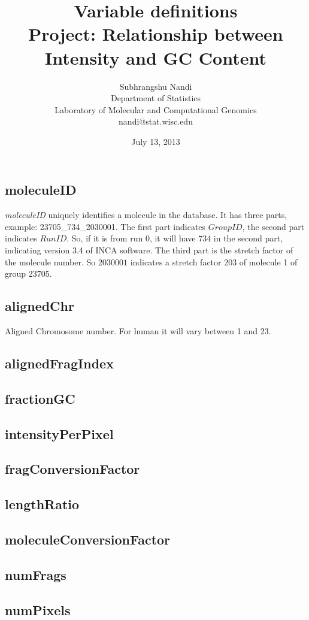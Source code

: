 \documentclass[11pt]{article}
\begin{document}


\title{Variable definitions\\ Project: Relationship between Intensity and GC Content}
\author{Subhrangshu Nandi\\
  Department of Statistics\\
  Laboratory of Molecular and Computational Genomics\\
  nandi@stat.wisc.edu}
\date{July 13, 2013}
\maketitle

\subsection*{moleculeID}
{\emph{moleculeID}} uniquely identifies a molecule in the database. It has three parts, example: 23705\_734\_2030001. The first part indicates $GroupID$, the second part indicates $RunID$. So, if it is from run $0$, it will have $734$ in the second part, indicating version 3.4 of INCA software. The third part is the stretch factor of the molecule number. So $2030001$ indicates a stretch factor 203 of molecule 1 of group 23705.

\subsection*{alignedChr}
Aligned Chromosome number. For human it will vary between 1 and 23.

\subsection*{alignedFragIndex}

\subsection*{fractionGC}

\subsection*{intensityPerPixel}

\subsection*{fragConversionFactor}

\subsection*{lengthRatio}

\subsection*{moleculeConversionFactor}

\subsection*{numFrags}

\subsection*{numPixels}
\end{document}
